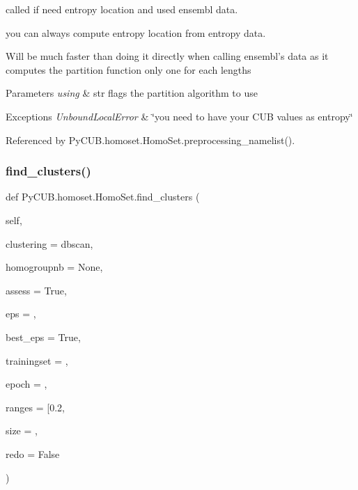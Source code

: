 called if need entropy location and used ensembl data. 

you can always compute entropy location from entropy data. \begin{DoxyVerb}   Will be much faster than doing it directly when calling
   ensembl's data as it computes the partition function
   only one for each lengths
\end{DoxyVerb}



\begin{DoxyParams}{Parameters}
{\em using} & str flags the partition algorithm to use\\
\hline
\end{DoxyParams}

\begin{DoxyExceptions}{Exceptions}
{\em Unbound\+Local\+Error} & \char`\"{}you need to have your C\+U\+B values as entropy\char`\"{} \\
\hline
\end{DoxyExceptions}


Referenced by Py\+C\+U\+B.\+homoset.\+Homo\+Set.\+preprocessing\+\_\+namelist().

\mbox{\label{class_py_c_u_b_1_1homoset_1_1_homo_set_a81b40822ff0d1d3e0cfccd6c3c54cdd6}} 
\subsubsection{\texorpdfstring{find\+\_\+clusters()}{find\_clusters()}}
{\footnotesize\ttfamily def Py\+C\+U\+B.\+homoset.\+Homo\+Set.\+find\+\_\+clusters (\begin{DoxyParamCaption}\item[{}]{self,  }\item[{}]{clustering = {\ttfamily \textquotesingle{}dbscan\textquotesingle{}},  }\item[{}]{homogroupnb = {\ttfamily None},  }\item[{}]{assess = {\ttfamily True},  }\item[{}]{eps = {},  }\item[{}]{best\+\_\+eps = {\ttfamily True},  }\item[{}]{trainingset = {},  }\item[{}]{epoch = {},  }\item[{}]{ranges = {\ttfamily \mbox{[}0.2},  }\item[{}]{size = {},  }\item[{}]{redo = {\ttfamily False} }\end{DoxyParamCaption})}



